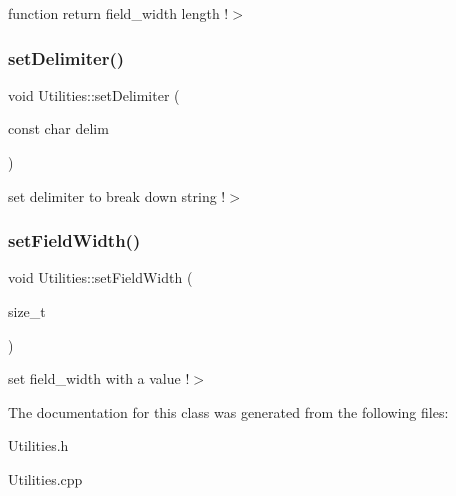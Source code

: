 function return field\+\_\+width length !$>$ \mbox{\label{class_utilities_a6961ff17f2a37332cff6ef51940b9c7b}} 
\subsubsection{\texorpdfstring{set\+Delimiter()}{setDelimiter()}}
{\footnotesize\ttfamily void Utilities\+::set\+Delimiter (\begin{DoxyParamCaption}\item[{const char}]{delim }\end{DoxyParamCaption})\hspace{0.3cm}{\ttfamily [static]}}

set delimiter to break down string !$>$ \mbox{\label{class_utilities_ac988cf9fa28095c6e5e478364a7115af}} 
\subsubsection{\texorpdfstring{set\+Field\+Width()}{setFieldWidth()}}
{\footnotesize\ttfamily void Utilities\+::set\+Field\+Width (\begin{DoxyParamCaption}\item[{size\+\_\+t}]{ }\end{DoxyParamCaption})}

set field\+\_\+width with a value !$>$ 

The documentation for this class was generated from the following files\+:\begin{DoxyCompactItemize}
\item 
Utilities.\+h\item 
Utilities.\+cpp\end{DoxyCompactItemize}

